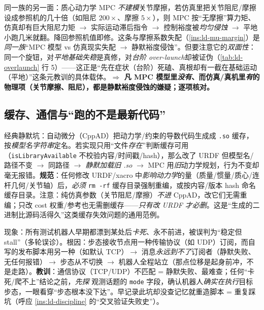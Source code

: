 \begin{insight}\label{ins:ld-joint-damping}
同一族的另一面：质心动力学 MPC \emph{不建模}关节摩擦，若仿真里把关节阻尼/摩擦设成参照机的几十倍（如阻尼 $200\times$、摩擦 $5\times$），则 MPC 按“无摩擦”算力矩、仿真却有巨大阻尼力矩 $\to$ 实际运动滞后指令 $\to$ 控制裕度被\emph{均匀侵蚀} $\to$ 平地小跑几米就翻。降回参照机值即修。这条与摩擦系数失配（\cref{ins:ld-mu-margin}）是\emph{同一族}“MPC 模型 vs 仿真现实失配 $\to$ 静默裕度侵蚀”。但要注意它的\emph{双面性}：同一个旋钮，对\emph{平地基础失稳}是真修，对\emph{台阶 over-launch}却被证伪（\cref{tab:ld-overlaunch} 行 5）——这正是“先在症状（台阶）死磕、真根却有一截在基础运动（平地）”这条元教训的具体载体。\textbf{$\Rightarrow$ 凡 MPC 模型里\emph{没有}、而仿真/真机里\emph{有}的物理项（关节摩擦、阻尼），都是静默裕度侵蚀的嫌疑；逐项核对。}
\end{insight}

\subsection{缓存、通信与“跑的不是最新代码”}
\label{subsec:ld-silent-build}

\begin{insight}\label{ins:ld-cppad-cache}
经典静默坑：自动微分（CppAD）把动力学/约束的导数代码生成成 \texttt{.so} 缓存，按\emph{模型名字符串}定名。若实现只用“文件\emph{存在}”判断缓存可用（\texttt{isLibraryAvailable} 不校验内容/时间戳/hash），那么改了 URDF 但模型名/路径不变 $\to$ 同路径 $\to$ \emph{静默加载旧 .so} $\to$ MPC 用\emph{旧}动力学规划，行为不变却毫无报错。\textbf{规范}：任何修改 URDF/xacro 中\emph{影响动力学}的量（质量/惯量/质心/连杆几何/关节轴）后，\emph{必须} \texttt{rm -rf} 缓存目录强制重编，或按内容/版本 hash 命名缓存目录。注意：纯仿真参数（关节阻尼/摩擦）\emph{不进} CppAD，改它们无需重编；只改 cost 权重/参考也无需删缓存——\emph{只有改 URDF 才必删}。这是“生成的二进制比源码活得久”这类缓存失效问题的通用范例。
\end{insight}

\begin{insight}\label{ins:ld-transport}
现象：所有测试机器人早期都漂到某处后\emph{卡死}、永不前进，被误判为“稳定但 stall”（多轮误诊）。根因：步态接收节点用一种传输协议（如 UDP）订阅，而自写的发布脚本用另一种（如默认 TCP）$\to$ 消息\emph{永远到不了}订阅者（静默失败、无任何报错）$\to$ 步态从不切换 $\to$ 机器人全程站立（那点位移是起身前冲，不是走路）。\textbf{教训}：通信协议（TCP/UDP）不匹配 = 静默失败、最难查；任何“卡死/爬不上”结论之前，\emph{先探} 观测话题的 \texttt{mode} 字段，确认机器人\emph{确实在执行}目标步态，一眼看穿“步态根本没下达”。早记录此坑却没查记忆就重造脚本 = 重复踩坑（呼应 \cref{ins:ld-discipline} 的“交叉验证失败史”）。
\end{insight}

